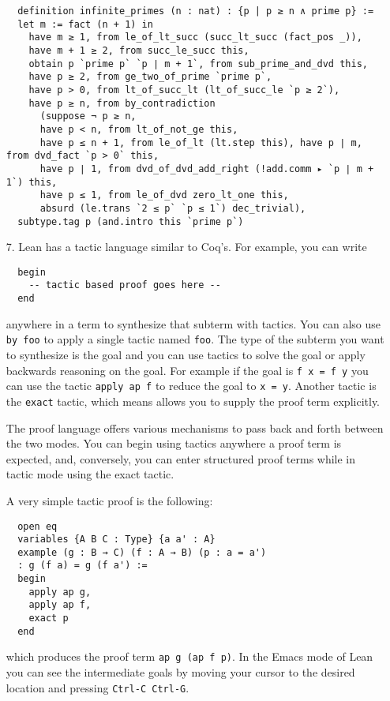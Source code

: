 \documentclass[11pt]{amsart}  %
\begin{document}
\begin{enumerate}
\begin{lstlisting}
  definition infinite_primes (n : nat) : {p | p ≥ n ∧ prime p} :=
  let m := fact (n + 1) in
    have m ≥ 1, from le_of_lt_succ (succ_lt_succ (fact_pos _)),
    have m + 1 ≥ 2, from succ_le_succ this,
    obtain p `prime p` `p ∣ m + 1`, from sub_prime_and_dvd this,
    have p ≥ 2, from ge_two_of_prime `prime p`,
    have p > 0, from lt_of_succ_lt (lt_of_succ_le `p ≥ 2`),
    have p ≥ n, from by_contradiction
      (suppose ¬ p ≥ n,
      have p < n, from lt_of_not_ge this,
      have p ≤ n + 1, from le_of_lt (lt.step this), have p ∣ m, from dvd_fact `p > 0` this,
      have p ∣ 1, from dvd_of_dvd_add_right (!add.comm ▸ `p ∣ m + 1`) this,
      have p ≤ 1, from le_of_dvd zero_lt_one this,
      absurd (le.trans `2 ≤ p` `p ≤ 1`) dec_trivial),
  subtype.tag p (and.intro this `prime p`)
\end{lstlisting}

\item[7.]  Lean has a tactic language similar to Coq's. For example, you can write
\begin{lstlisting}
  begin
    -- tactic based proof goes here -- 
  end
\end{lstlisting}
anywhere in a term to synthesize that subterm with tactics.
You can also use \lstinline{by foo} to apply a single tactic named \lstinline{foo}.
The type of the subterm you want to synthesize is the goal and you can use
tactics to solve the goal or apply backwards reasoning on the goal.
For example if the goal is \lstinline{f x = f y} you can use the tactic \lstinline{apply ap f} to reduce the goal to
\lstinline{x = y}. Another tactic is the \lstinline{exact} tactic, which means allows you to supply the proof term explicitly. 

The proof language offers various mechanisms to pass back and forth between the two modes.
You can begin using tactics anywhere a proof term is expected, and, conversely, you can enter
structured proof terms while in tactic mode using the exact tactic.

A very simple tactic proof is the following:
\begin{lstlisting}
  open eq
  variables {A B C : Type} {a a' : A}
  example (g : B → C) (f : A → B) (p : a = a')
  : g (f a) = g (f a') :=
  begin
    apply ap g,
    apply ap f,
    exact p
  end
\end{lstlisting}
which produces the proof term \lstinline{ap g (ap f p)}. In the Emacs mode of Lean you can see the
intermediate goals by moving your cursor to the desired location and pressing \lstinline{Ctrl-C Ctrl-G}.


\end{enumerate}
\end{document}
